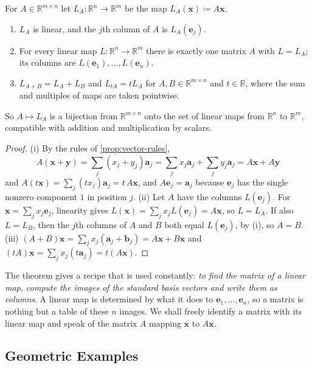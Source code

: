 \begin{theorem}
\label{thm:matrices-linear-maps}
For $A\in\mathbb R^{m\times n}$ let $L_A\colon\mathbb R^n\to\mathbb R^m$ be the map $L_A(\mathbf x)\coloneqq A\mathbf x$.
\begin{enumerate}
\item $L_A$ is linear, and the $j$th column of $A$ is $L_A(\mathbf e_j)$.
\item For every linear map $L\colon\mathbb R^n\to\mathbb R^m$ there is exactly one matrix $A$ with $L=L_A$; its columns are $L(\mathbf e_1),\ldots,L(\mathbf e_n)$.
\item $L_{A+B}=L_A+L_B$ and $L_{tA}=tL_A$ for $A,B\in\mathbb R^{m\times n}$ and $t\in\mathbb R$, where the sum and multiples of maps are taken pointwise.
\end{enumerate}
So $A\mapsto L_A$ is a bijection from $\mathbb R^{m\times n}$ onto the set of linear maps from $\mathbb R^n$ to $\mathbb R^m$, compatible with addition and multiplication by scalars.
\end{theorem}

\begin{proof}
(i) By the rules of \cref{prop:vector-rules},
\[
A(\mathbf x+\mathbf y)=\sum_j(x_j+y_j)\mathbf a_j=\sum_jx_j\mathbf a_j+\sum_jy_j\mathbf a_j=A\mathbf x+A\mathbf y
\]
and $A(t\mathbf x)=\sum_j(tx_j)\mathbf a_j=t\,A\mathbf x$, and $A\mathbf e_j=\mathbf a_j$ because $\mathbf e_j$ has the single nonzero component $1$ in position $j$. (ii) Let $A$ have the columns $L(\mathbf e_j)$. For $\mathbf x=\sum_jx_j\mathbf e_j$, linearity gives $L(\mathbf x)=\sum_jx_jL(\mathbf e_j)=A\mathbf x$, so $L=L_A$. If also $L=L_B$, then the $j$th columns of $A$ and $B$ both equal $L(\mathbf e_j)$, by (i), so $A=B$. (iii) $(A+B)\mathbf x=\sum_jx_j(\mathbf a_j+\mathbf b_j)=A\mathbf x+B\mathbf x$ and $(tA)\mathbf x=\sum_jx_j(t\mathbf a_j)=t(A\mathbf x)$.
\end{proof}

The theorem gives a recipe that is used constantly: \emph{to find the matrix of a linear map, compute the images of the standard basis vectors and write them as columns}. A linear map is determined by what it does to $\mathbf e_1,\ldots,\mathbf e_n$, so a matrix is nothing but a table of these $n$ images. We shall freely identify a matrix with its linear map and speak of the matrix $A$ mapping $\mathbf x$ to $A\mathbf x$.

\subsection{Geometric Examples}

